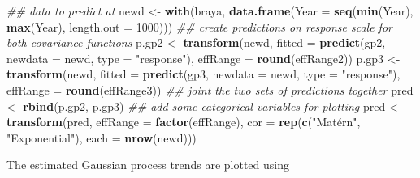 \documentclass[12pt,]{article}
\newenvironment{Shaded}{\begin{snugshade}}{\end{snugshade}}
\newcommand{\CommentTok}[1]{\textcolor[rgb]{0.56,0.35,0.01}{\textit{#1}}}
\newcommand{\DataTypeTok}[1]{\textcolor[rgb]{0.13,0.29,0.53}{#1}}
\newcommand{\DecValTok}[1]{\textcolor[rgb]{0.00,0.00,0.81}{#1}}
\newcommand{\KeywordTok}[1]{\textcolor[rgb]{0.13,0.29,0.53}{\textbf{#1}}}
\newcommand{\NormalTok}[1]{#1}
\newcommand{\OperatorTok}[1]{\textcolor[rgb]{0.81,0.36,0.00}{\textbf{#1}}}
\newcommand{\OtherTok}[1]{\textcolor[rgb]{0.56,0.35,0.01}{#1}}
\newcommand{\StringTok}[1]{\textcolor[rgb]{0.31,0.60,0.02}{#1}}
\begin{document}
\begin{Shaded}
\begin{Highlighting}[]
\CommentTok{## data to predict at}
\NormalTok{newd <-}\StringTok{ }\KeywordTok{with}\NormalTok{(braya, }\KeywordTok{data.frame}\NormalTok{(}\DataTypeTok{Year =} \KeywordTok{seq}\NormalTok{(}\KeywordTok{min}\NormalTok{(Year), }\KeywordTok{max}\NormalTok{(Year),}
                               \DataTypeTok{length.out =} \DecValTok{1000}\NormalTok{)))}
\CommentTok{## create predictions on response scale for both covariance functions}
\NormalTok{p.gp2 <-}\StringTok{ }\KeywordTok{transform}\NormalTok{(newd,}
                   \DataTypeTok{fitted =} \KeywordTok{predict}\NormalTok{(gp2, }\DataTypeTok{newdata =}\NormalTok{ newd, }\DataTypeTok{type =} \StringTok{"response"}\NormalTok{),}
                   \DataTypeTok{effRange =} \KeywordTok{round}\NormalTok{(effRange2))}
\NormalTok{p.gp3 <-}\StringTok{ }\KeywordTok{transform}\NormalTok{(newd,}
                   \DataTypeTok{fitted =} \KeywordTok{predict}\NormalTok{(gp3, }\DataTypeTok{newdata =}\NormalTok{ newd, }\DataTypeTok{type =} \StringTok{"response"}\NormalTok{),}
                   \DataTypeTok{effRange =} \KeywordTok{round}\NormalTok{(effRange3))}
\CommentTok{## joint the two sets of predictions together}
\NormalTok{pred <-}\StringTok{ }\KeywordTok{rbind}\NormalTok{(p.gp2, p.gp3)}
\CommentTok{## add some categorical variables for plotting}
\NormalTok{pred <-}\StringTok{ }\KeywordTok{transform}\NormalTok{(pred,}
                  \DataTypeTok{effRange =} \KeywordTok{factor}\NormalTok{(effRange),}
                  \DataTypeTok{cor =} \KeywordTok{rep}\NormalTok{(}\KeywordTok{c}\NormalTok{(}\StringTok{"Matérn"}\NormalTok{, }\StringTok{"Exponential"}\NormalTok{), }\DataTypeTok{each =} \KeywordTok{nrow}\NormalTok{(newd)))}
\end{Highlighting}
\end{Shaded}

The estimated Gaussian process trends are plotted using

\begin{Shaded}
\end{Shaded}
\end{document}
